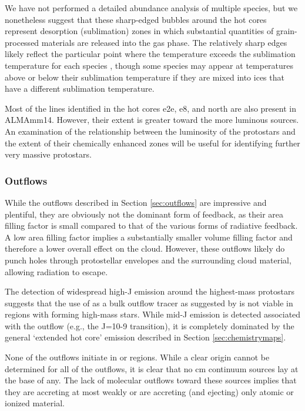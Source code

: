 \documentclass{aa}
\begin{document}
We have not performed a detailed abundance analysis of multiple species, but we
nonetheless suggest that these sharp-edged bubbles around the hot cores
represent desorption (sublimation) zones in which substantial quantities of
grain-processed materials are released into the gas phase.  The relatively
sharp edges likely reflect the particular point where the temperature exceeds
the sublimation temperature for each species \citep{Garrod2006a}, though some
species may appear at temperatures above or below their sublimation temperature
if they are mixed into ices that have a different sublimation temperature.

Most of the lines identified in the hot cores e2e, e8, and north are also
present in ALMAmm14.  However, their extent is greater toward the more luminous
sources.  An examination of the relationship between the luminosity of the
protostars and the extent of their chemically enhanced zones will be useful for
identifying further very massive protostars.


\subsubsection{Outflows}
\label{sec:outflowdiscussion}
While the outflows described in Section \ref{sec:outflows} are impressive and
plentiful, they are obviously not the dominant form of feedback, as their area
filling factor is small compared to that of the various forms of radiative
feedback.  A low area filling factor implies a substantially smaller volume
filling factor and therefore a lower overall effect on the cloud.  However,
these outflows likely do punch holes through protostellar envelopes and the
surrounding cloud material, allowing radiation to escape.

The detection of widespread high-J \methanol emission around the highest-mass
protostars suggests that the use of \methanol as a bulk outflow tracer as
suggested by \citet{Kristensen2015a} is not viable in regions with forming
high-mass stars.  While mid-J \methanol emission is detected associated with
the outflow (e.g., the J=10-9 transition), it is completely dominated by the
general `extended hot core' emission described in Section
\ref{sec:chemistrymaps}.

None of the outflows initiate in \uchii or \hchii regions.  While a clear
origin cannot be determined for all of the outflows, it is clear that no cm
continuum sources lay at the base of any.  The lack of molecular outflows
toward these sources implies that they are accreting at most weakly or are
accreting (and ejecting) only atomic or ionized material.
\end{document}
